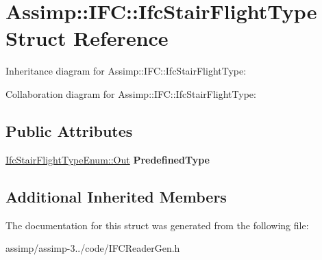 \hypertarget{struct_assimp_1_1_i_f_c_1_1_ifc_stair_flight_type}{\section{Assimp\+:\+:I\+F\+C\+:\+:Ifc\+Stair\+Flight\+Type Struct Reference}
\label{struct_assimp_1_1_i_f_c_1_1_ifc_stair_flight_type}
}


Inheritance diagram for Assimp\+:\+:I\+F\+C\+:\+:Ifc\+Stair\+Flight\+Type\+:


Collaboration diagram for Assimp\+:\+:I\+F\+C\+:\+:Ifc\+Stair\+Flight\+Type\+:
\subsection*{Public Attributes}
\begin{DoxyCompactItemize}
\item 
\hypertarget{struct_assimp_1_1_i_f_c_1_1_ifc_stair_flight_type_a9b2e020f25b3a187a0d712d4c1929207}{\hyperlink{classboost_1_1shared__ptr}{Ifc\+Stair\+Flight\+Type\+Enum\+::\+Out} {\bfseries Predefined\+Type}}\label{struct_assimp_1_1_i_f_c_1_1_ifc_stair_flight_type_a9b2e020f25b3a187a0d712d4c1929207}

\end{DoxyCompactItemize}
\subsection*{Additional Inherited Members}


The documentation for this struct was generated from the following file\+:\begin{DoxyCompactItemize}
\item 
assimp/assimp-\/3../code/I\+F\+C\+Reader\+Gen.\+h\end{DoxyCompactItemize}
